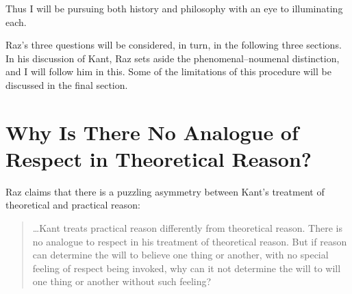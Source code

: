 \documentclass[12pt]{article}
\begin{document}
Thus I will be pursuing both history and philosophy with an eye to illuminating each.


Raz's three questions will be considered, in turn, in the following three sections. In his discussion of Kant, Raz sets aside the phenomenal--noumenal distinction, and I will follow him in this. Some of the limitations of this procedure will be discussed in the final section.


\section{Why Is There No Analogue of Respect in Theoretical Reason?} \label{sec:why_is_there_no_analogue_of_respect_in_theoretical_reason} %

Raz claims that there is a puzzling asymmetry between Kant's treatment of theoretical and practical reason: 
\begin{quote}
	\ldots Kant treats practical reason differently from theoretical reason. There is no analogue to respect in his treatment of theoretical reason. But if reason can determine the will to believe one thing or another, with no special feeling of respect being invoked, why can it not determine the will to will one thing or another without such feeling? \citep[132--3]{Raz:2001ps} 
\end{quote}
\end{document}
